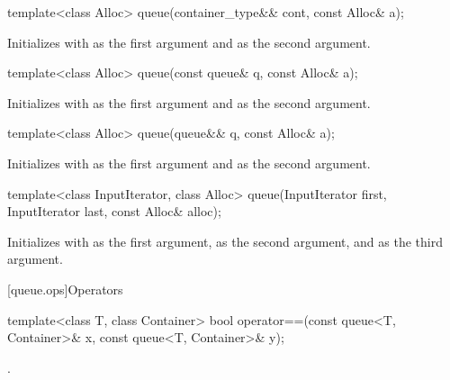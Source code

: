 %
\begin{itemdecl}
template<class Alloc> queue(container_type&& cont, const Alloc& a);
\end{itemdecl}

\begin{itemdescr}
\pnum
\effects
Initializes  with  as the first argument and 
as the second argument.
\end{itemdescr}

%
\begin{itemdecl}
template<class Alloc> queue(const queue& q, const Alloc& a);
\end{itemdecl}

\begin{itemdescr}
\pnum
\effects
Initializes  with  as the first argument and  as the
second argument.
\end{itemdescr}

%
\begin{itemdecl}
template<class Alloc> queue(queue&& q, const Alloc& a);
\end{itemdecl}

\begin{itemdescr}
\pnum
\effects
Initializes  with  as the first argument and 
as the second argument.
\end{itemdescr}

%
\begin{itemdecl}
template<class InputIterator, class Alloc>
  queue(InputIterator first, InputIterator last, const Alloc& alloc);
\end{itemdecl}

\begin{itemdescr}
\pnum
\effects
Initializes  with
 as the first argument,
 as the second argument, and
 as the third argument.
\end{itemdescr}

[queue.ops]{Operators}

%
\begin{itemdecl}
template<class T, class Container>
  bool operator==(const queue<T, Container>& x, const queue<T, Container>& y);
\end{itemdecl}

\begin{itemdescr}
\pnum
\returns
{}.
\end{itemdescr}

